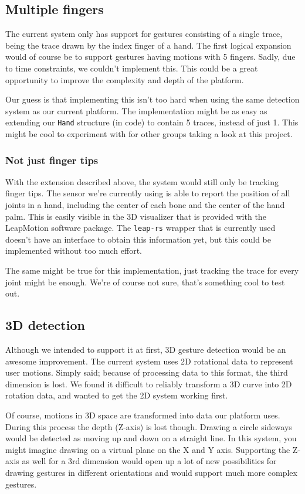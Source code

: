 \documentclass[a4paper]{article}
\begin{document}
  \subsection{Multiple fingers}
  The current system only has support for gestures consisting of a single trace,
  being the trace drawn by the index finger of a hand. The first logical
  expansion would of course be to support gestures having motions with 5
  fingers. Sadly, due to time constraints, we couldn't implement this.
  This could be a great opportunity to improve the complexity and depth of the platform.

  Our guess is that implementing this isn't too hard when using the same
  detection system as our current platform. The implementation might be as easy
  as extending our \verb_Hand_ structure (in code) to contain 5 traces, instead
  of just 1. This might be cool to experiment with for other groups taking a
  look at this project.

  \subsubsection{Not just finger tips}
  With the extension described above, the system would still only be tracking
  finger tips. The sensor we're currently using is able to report the position
  of all joints in a hand, including the center of each bone and the center of
  the hand palm. This is easily visible in the 3D visualizer that is provided
  with the LeapMotion software package. The \verb_leap-rs_ wrapper that is
  currently used doesn't have an interface to obtain this information yet,
  but this could be implemented without too much effort.

  The same might be true for this implementation, just tracking the trace for
  every joint might be enough. We're of course not sure, that's something cool
  to test out.

  \subsection{3D detection}
  Although we intended to support it at first, 3D gesture detection would be an
  awesome improvement. The current system uses 2D rotational data to represent
  user motions. Simply said; because of processing data to this format, the
  third dimension is lost. We found it difficult to reliably transform a 3D
  curve into 2D rotation data, and wanted to get the 2D system working first.

  Of course, motions in 3D space are transformed into data our platform uses.
  During this process the depth (Z-axis) is lost though. Drawing a circle
  sideways would be detected as moving up and down on a straight line. In this
  system, you might imagine drawing on a virtual plane on the X and Y axis.
  Supporting the Z-axis as well for a 3rd dimension would open up a lot of new
  possibilities for drawing gestures in different orientations and would support
  much more complex gestures.
\end{document}
